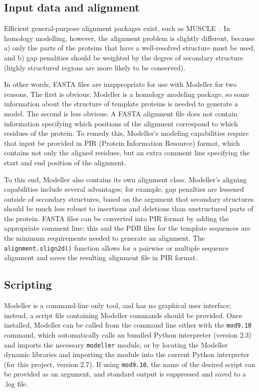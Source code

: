 \documentclass[notitlepage]{report}   %
\begin{document}
\subsection*{Input data and alignment} 
Efficient general-purpose alignment packages exist, such as MUSCLE~\cite{edgar2004muscle}. In homology modelling, however, the alignment problem is slightly different, because a) only the parts of the proteins that have a well-resolved structure must be used, and b) gap penalities should be weighted by the degree of secondary structure (highly structured regions are more likely to be conserved).

In other words, FASTA files are inappropriate for use with Modeller for two reasons. The first is obvious: Modeller is a homology modeling package, so some information about the structure of template proteins is needed to generate a model. The second is less obvious: A FASTA alignment file does not contain information specifying which positions of the alignment correspond to which residues of the protein. To remedy this, Modeller's modeling capabilities require that input be provided in PIR (Protein Information Resource) format, which contains not only the aligned residues, but an extra comment line specifying the start and end position of the alignment.

To this end, Modeller also contains its own alignment class. Modeller's aligning capabilities include several advantages; for example, gap penalties are lessened outside of secondary structures, based on the argument that secondary structures should be much less robust to insertions and deletions than unstructured parts of the protein. FASTA files can be converted into PIR format by adding the appropriate comment line; this and the PDB files for the template sequences are the minimum requirements needed to generate an alignment. The \texttt{alignment.slign2d()} function allows for a pairwise or multiple sequence alignment and saves the resulting alignment file in PIR format.

\subsection*{Scripting}
Modeller is a command-line only tool, and has no graphical user interface; instead, a script file containing Modeller commands should be provided. Once installed, Modeller can be called from the command line either with the \texttt{mod9.10} command, which automatically calls an bundled Python interpreter (version 2.3) and imports the necessary \texttt{modeller} module, or by locating the Modeller dynamic libraries and importing the module into the current Python interpreter (for this project, version 2.7). If using \texttt{mod9.10}, the name of the desired script can be provided as an argument, and standard output is suppressed and saved to a .log file.
\end{document}
